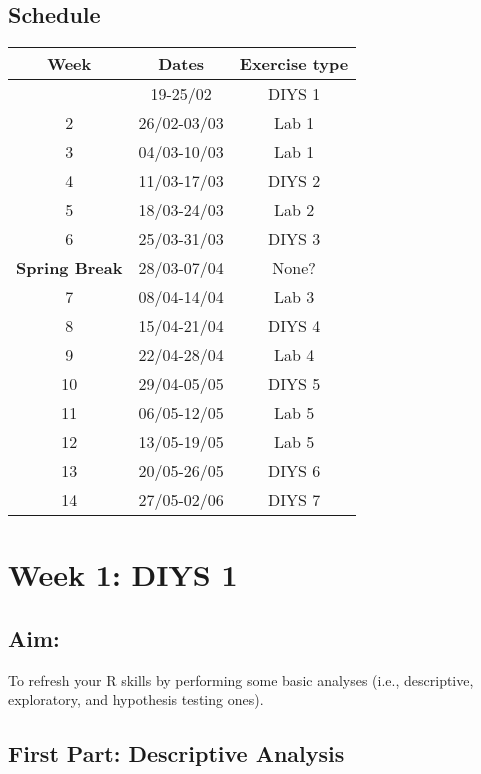 \documentclass[
]{book}
\begin{document}
\hypertarget{schedule}{%
\section{Schedule}\label{schedule}}

\begin{longtable}[]{@{}ccc@{}}
\toprule\noalign{}
Week & Dates & Exercise type \\
\midrule\noalign{}
\endhead
\bottomrule\noalign{}
\endlastfoot
1 & 19-25/02 & DIYS 1 \\
2 & 26/02-03/03 & Lab 1 \\
3 & 04/03-10/03 & Lab 1 \\
4 & 11/03-17/03 & DIYS 2 \\
5 & 18/03-24/03 & Lab 2 \\
6 & 25/03-31/03 & DIYS 3 \\
\textbf{Spring Break} & 28/03-07/04 & None? \\
7 & 08/04-14/04 & Lab 3 \\
8 & 15/04-21/04 & DIYS 4 \\
9 & 22/04-28/04 & Lab 4 \\
10 & 29/04-05/05 & DIYS 5 \\
11 & 06/05-12/05 & Lab 5 \\
12 & 13/05-19/05 & Lab 5 \\
13 & 20/05-26/05 & DIYS 6 \\
14 & 27/05-02/06 & DIYS 7 \\
\end{longtable}

\hypertarget{week-1-diys-1}{%
\chapter{Week 1: DIYS 1}\label{week-1-diys-1}}

\hypertarget{aim}{%
\section{Aim:}\label{aim}}

To refresh your R skills by performing some basic analyses (i.e., descriptive, exploratory, and hypothesis testing ones).

\hypertarget{first-part-descriptive-analysis}{%
\section{First Part: Descriptive Analysis}\label{first-part-descriptive-analysis}}
\end{document}
